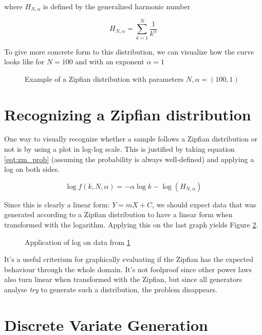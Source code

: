 where $H_{N,\alpha}$ is defined by the generalized harmonic number

\begin{equation}\label{eqt:generalized_hn}
    H_{N, \alpha} = \sum_{k = 1}^{N} \frac{1}{k^\alpha}
\end{equation}

To give more concrete form to this distribution, we can visualize how the curve looks like for $N = 100$ and with an
exponent $\alpha = 1$

\begin{figure}
    \centering
    \caption{Example of a Zipfian distribution with parameters $N,\alpha = (100, 1)$}\label{fig:zipf_pmf}
\end{figure}

\section{Recognizing a Zipfian distribution}
One way to visually recognize whether a sample follows a Zipfian distribution or not is by using a plot in log-log scale.
This is justified by taking equation \ref{eqt:zm_prob} (assuming the probability is always well-defined) and applying
a log on both sides.

\begin{equation}
    \log{f(k,N,\alpha)} = -\alpha\log{k} - \log(H_{N,\alpha})
\end{equation}

Since this is clearly a linear form: $Y = mX + C$, we should expect data that was generated according to a Zipfian distribution
to have a linear form when transformed with the logarithm. Applying this on the last graph yields Figure \ref{fig:loglog_zipf}.

\begin{figure}
    \centering
    \caption{Application of log on data from \ref{fig:zipf_pmf}}\label{fig:loglog_zipf}
\end{figure}

It's a useful criterium for graphically evaluating if the Zipfian has the expected behaviour through the whole domain. It's not 
foolproof since other power laws also turn linear when transformed with the Zipfian, but since all generators analyse \textit{try} to generate 
such a distribution, the problem disappears.

\section{Discrete Variate Generation}

